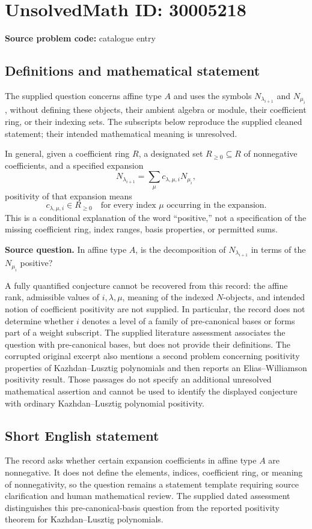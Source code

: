 \documentclass[11pt]{article}
\begin{document}
\section*{UnsolvedMath ID: 30005218}
\textbf{Source problem code:} catalogue entry
\subsection{Definitions and mathematical statement}
The supplied question concerns affine type \(A\) and uses the symbols \(N_{\lambda_{i+1}}\) and \(N_{\mu_i}\), without defining these objects, their ambient algebra or module, their coefficient ring, or their indexing sets. The subscripts below reproduce the supplied cleaned statement; their intended mathematical meaning is unresolved.

In general, given a coefficient ring \(R\), a designated set \(R_{\geq 0}\subseteq R\) of nonnegative coefficients, and a specified expansion
\[
N_{\lambda_{i+1}}=\sum_{\mu}c_{\lambda,\mu,i}N_{\mu_i},
\]
positivity of that expansion means
\[
c_{\lambda,\mu,i}\in R_{\geq 0}
\quad\text{for every index \(\mu\) occurring in the expansion.}
\]
This is a conditional explanation of the word ``positive,'' not a specification of the missing coefficient ring, index ranges, basis properties, or permitted sums.

\textbf{Source question.} In affine type \(A\), is the decomposition of \(N_{\lambda_{i+1}}\) in terms of the \(N_{\mu_i}\) positive?

A fully quantified conjecture cannot be recovered from this record: the affine rank, admissible values of \(i,\lambda,\mu\), meaning of the indexed \(N\)-objects, and intended notion of coefficient positivity are not supplied. In particular, the record does not determine whether \(i\) denotes a level of a family of pre-canonical bases or forms part of a weight subscript. The supplied literature assessment associates the question with pre-canonical bases, but does not provide their definitions. The corrupted original excerpt also mentions a second problem concerning positivity properties of Kazhdan--Lusztig polynomials and then reports an Elias--Williamson positivity result. Those passages do not specify an additional unresolved mathematical assertion and cannot be used to identify the displayed conjecture with ordinary Kazhdan--Lusztig polynomial positivity.
\subsection{Short English statement}
The record asks whether certain expansion coefficients in affine type \(A\) are nonnegative. It does not define the elements, indices, coefficient ring, or meaning of nonnegativity, so the question remains a statement template requiring source clarification and human mathematical review. The supplied dated assessment distinguishes this pre-canonical-basis question from the reported positivity theorem for Kazhdan--Lusztig polynomials.
\end{document}
